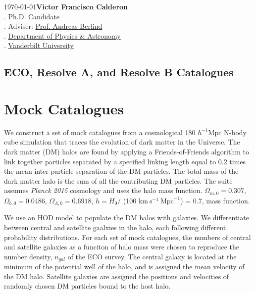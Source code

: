\documentclass[a4paper, 11pt]{article}
\newcommand{\kmsMpc}{\mbox{$\textrm{km}\ \textrm{s}^{-1}\ \textrm{Mpc}^{-1}$}}
\begin{document}
\noindent
\large \today \hfill \textbf{Victor Francisco Calderon} \\
\normalsize . \hfill Ph.D. Candidate\\
\normalsize . \hfill Adviser: \href{http://astro.phy.vanderbilt.edu/~berlinaa/}{Prof. Andreas Berlind}\\
\normalsize . \hfill \href{https://as.vanderbilt.edu/astronomy/}{Department of Physics \& Astronomy} \\
\normalsize . \hfill \href{http://www.vanderbilt.edu/}{Vanderbilt University} \
\normalsize\hfill  \\


\begin{centering}
\section*{ECO, Resolve A, and Resolve B Catalogues}\label{sec:catalogues}
\end{centering}

\section{Mock Catalogues}\label{sec:mock_catls}

We construct a set of mock catalogues from a cosmological 180 
$h^{-1} \mathrm{Mpc}$ N-body cube
simulation that traces the evolution of dark matter in the Universe.
The dark matter (DM) halos are found by applying a Friends-of-Friends
algorithm \citep[FoF;]{Davis1985a} to link together particles 
separated by a specified linking length equal to 0.2 times the 
mean inter-particle separation of the DM particles. The total mass of the 
dark matter halo is the sum of all the contributing DM particles. The 
suite assumes \textit{Planck 2015} \citep{Planck2016} cosmology and uses 
the \citet{Warren2006} halo mass function.
$\Omega_{m,0} = 0.307$,
$\Omega_{b,0} = 0.0486$,
$\Omega_{\Lambda,0} = 0.6918$,
$h = H_{0}/$ (100 \kmsMpc) = 0.7,
mass function.

We use an HOD \citep{Berlind2002} model to populate the DM halos
with galaxies. We differentiate between central and satellite 
gaalxies in the halo, each following different probability distributions.
For each set of mock catalogues, the numbers of central and satellite
galaxies as a funciton of halo mass were chosen to reproduce 
the number density, $n_{gal}$ of the ECO survey. The central galaxy is 
located at the minimum of the potential well of the halo, and is 
assigned the mean velocity of the DM halo. Satellite galaxies 
are assigned the positions and velocities of randomly chosen DM particles 
bound to the host halo.
\end{document}
